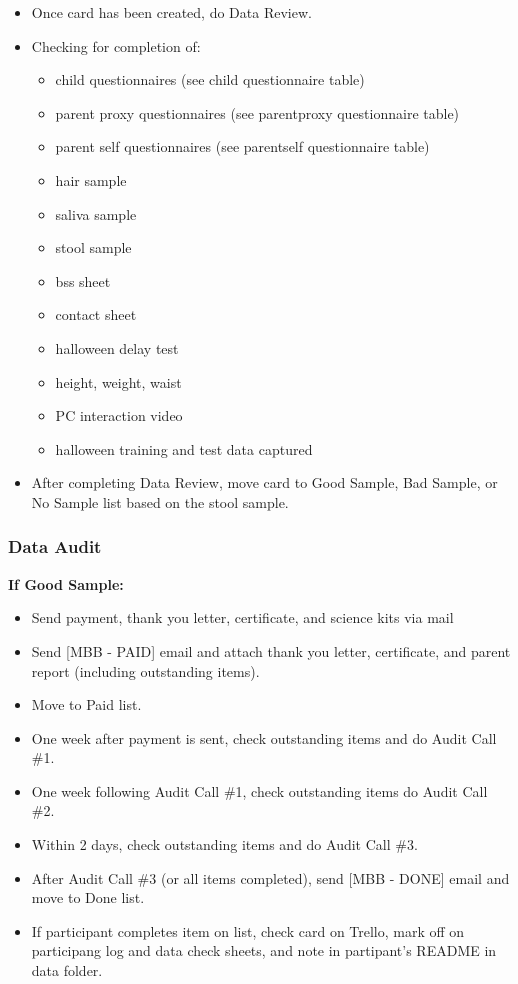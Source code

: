 \documentclass[]{book}
\providecommand{\tightlist}{%
  \setlength{\itemsep}{0pt}\setlength{\parskip}{0pt}}
\begin{document}
\begin{itemize}
\tightlist
\item
  Once card has been created, do Data Review.
\item
  Checking for completion of:

  \begin{itemize}
  \tightlist
  \item
    child questionnaires (see child questionnaire table)
  \item
    parent proxy questionnaires (see parentproxy questionnaire table)
  \item
    parent self questionnaires (see parentself questionnaire table)
  \item
    hair sample
  \item
    saliva sample
  \item
    stool sample
  \item
    bss sheet
  \item
    contact sheet
  \item
    halloween delay test
  \item
    height, weight, waist
  \item
    PC interaction video
  \item
    halloween training and test data captured
  \end{itemize}
\item
  After completing Data Review, move card to Good Sample, Bad Sample, or No Sample list based on the stool sample.
\end{itemize}

\hypertarget{data-audit}{%
\subsubsection{Data Audit}\label{data-audit}}

\textbf{If Good Sample:}

\begin{itemize}
\tightlist
\item
  Send payment, thank you letter, certificate, and science kits via mail
\item
  Send {[}MBB - PAID{]} email and attach thank you letter, certificate, and parent report (including outstanding items).
\item
  Move to Paid list.
\item
  One week after payment is sent, check outstanding items and do Audit Call \#1.
\item
  One week following Audit Call \#1, check outstanding items do Audit Call \#2.
\item
  Within 2 days, check outstanding items and do Audit Call \#3.
\item
  After Audit Call \#3 (or all items completed), send {[}MBB - DONE{]} email and move to Done list.
\item
  If participant completes item on list, check card on Trello, mark off on participang log and data check sheets, and note in partipant's README in data folder.
\end{itemize}
\end{document}
